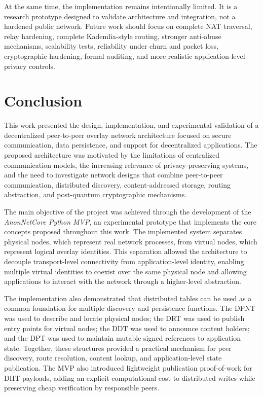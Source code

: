 \documentclass[12pt,a4paper]{article}
\begin{document}
At the same time, the implementation remains intentionally limited. It is a research prototype designed to validate architecture and integration, not a hardened public network. Future work should focus on complete NAT traversal, relay hardening, complete Kademlia-style routing, stronger anti-abuse mechanisms, scalability tests, reliability under churn and packet loss, cryptographic hardening, formal auditing, and more realistic application-level privacy controls.

















\clearpage
\section{Conclusion}
\label{sec:conclusion}

This work presented the design, implementation, and experimental validation of a decentralized peer-to-peer overlay network architecture focused on secure communication, data persistence, and support for decentralized applications. The proposed architecture was motivated by the limitations of centralized communication models, the increasing relevance of privacy-preserving systems, and the need to investigate network designs that combine peer-to-peer communication, distributed discovery, content-addressed storage, routing abstraction, and post-quantum cryptographic mechanisms.

The main objective of the project was achieved through the development of the \textit{AnonNetCore Python MVP}, an experimental prototype that implements the core concepts proposed throughout this work. The implemented system separates physical nodes, which represent real network processes, from virtual nodes, which represent logical overlay identities. This separation allowed the architecture to decouple transport-level connectivity from application-level identity, enabling multiple virtual identities to coexist over the same physical node and allowing applications to interact with the network through a higher-level abstraction.

The implementation also demonstrated that distributed tables can be used as a common foundation for multiple discovery and persistence functions. The DPNT was used to describe and locate physical nodes; the DRT was used to publish entry points for virtual nodes; the DDT was used to announce content holders; and the DPT was used to maintain mutable signed references to application state. Together, these structures provided a practical mechanism for peer discovery, route resolution, content lookup, and application-level state publication. The MVP also introduced lightweight publication proof-of-work for DHT payloads, adding an explicit computational cost to distributed writes while preserving cheap verification by responsible peers.
\end{document}
